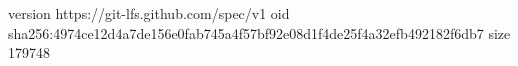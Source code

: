 version https://git-lfs.github.com/spec/v1
oid sha256:4974ce12d4a7de156e0fab745a4f57bf92e08d1f4de25f4a32efb492182f6db7
size 179748
